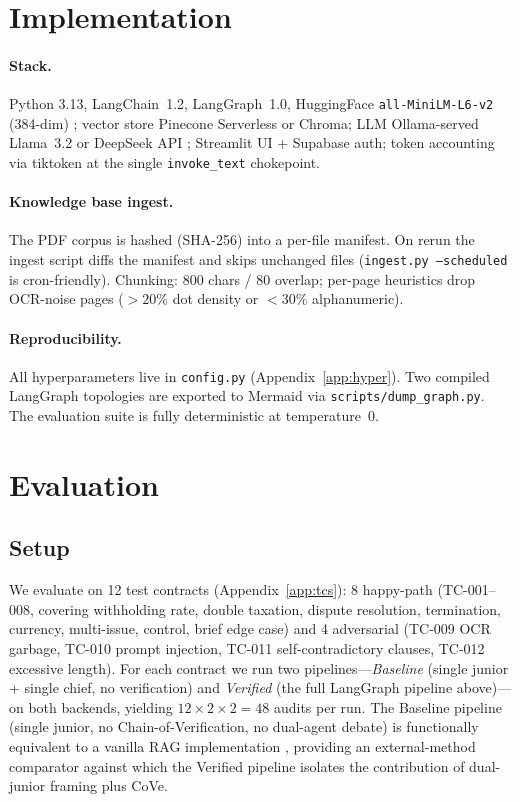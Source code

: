 \documentclass{article}
\begin{document}
\FloatBarrier
\section{Implementation}
\label{sec:impl}

\paragraph{Stack.} Python 3.13, LangChain~1.2, LangGraph~1.0,
HuggingFace \texttt{all-MiniLM-L6-v2} (384-dim) \cite{reimers2019sbert};
vector store Pinecone Serverless or Chroma; LLM Ollama-served
Llama~3.2 \cite{meta2024llama3} or DeepSeek API \cite{deepseek2024v3};
Streamlit UI + Supabase auth; token accounting via tiktoken at the
single \texttt{invoke\_text} chokepoint.

\paragraph{Knowledge base ingest.} The PDF corpus is hashed
(SHA-256) into a per-file manifest. On rerun the ingest script
diffs the manifest and skips unchanged files
(\texttt{ingest.py --scheduled} is cron-friendly). Chunking:
800 chars / 80 overlap; per-page heuristics drop OCR-noise pages
($>20\%$ dot density or $<30\%$ alphanumeric).

\paragraph{Reproducibility.} All hyperparameters live in
\texttt{config.py} (Appendix~\ref{app:hyper}). Two compiled
LangGraph topologies are exported to Mermaid via
\texttt{scripts/dump\_graph.py}. The evaluation suite is fully
deterministic at temperature~0.

\section{Evaluation}
\label{sec:eval}

\subsection{Setup}
We evaluate on 12 test contracts (Appendix~\ref{app:tcs}): 8 happy-path
(TC-001--008, covering withholding rate, double taxation, dispute
resolution, termination, currency, multi-issue, control, brief edge
case) and 4 adversarial (TC-009 OCR garbage, TC-010 prompt injection,
TC-011 self-contradictory clauses, TC-012 excessive length). For each
contract we run two pipelines---\emph{Baseline} (single junior +
single chief, no verification) and \emph{Verified} (the full
LangGraph pipeline above)---on both backends, yielding $12 \times 2
\times 2 = 48$ audits per run. The Baseline pipeline (single junior,
no Chain-of-Verification, no dual-agent debate) is functionally
equivalent to a vanilla RAG implementation \cite{lewis2020rag},
providing an external-method comparator against which the Verified
pipeline isolates the contribution of dual-junior framing plus CoVe.
\end{document}
